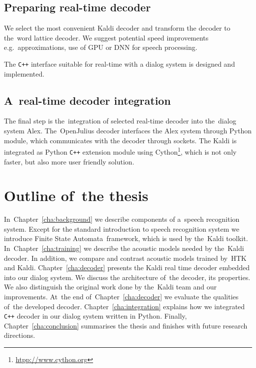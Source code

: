 \subsection{Preparing real-time decoder} 
\label{sub:compare_rt}

We select the most convenient Kaldi decoder and 
transform the decoder to the~word lattice decoder. 
We suggest potential speed improvements e.g.\ approximations, use of \ac{GPU} 
or \ac{DNN} for speech processing\cite{vesely2013sequencediscriminative}.

The \verb!C++! interface suitable for real-time with a dialog system is designed and implemented.

\subsection{A~real-time decoder integration} 
\label{sub:integration}
The final step is the~integration of selected real-time decoder into the~dialog system Alex.
The~OpenJulius decoder interfaces the Alex system through Python module, 
which communicates with the decoder through sockets.
The Kaldi is integrated as Python \verb!C++! extension module 
using Cython\footnote{\url{htpp://www.cython.org}}, 
which is not only faster, but also more user friendly solution.


\section{Outline of~the thesis} 
\label{sec:outline_of_the_thesis}
In~Chapter~\ref{cha:background} we describe components of a~speech recognition system.  
Except for the standard introduction to speech recognition system we introduce Finite State Automata~framework,
which is used by the~Kaldi toolkit. In~Chapter~\ref{cha:training} we describe the acoustic 
models needed by the~Kaldi decoder. 
In addition, we compare and contrast acoustic models trained by~\ac{HTK} and Kaldi. 
Chapter~\ref{cha:decoder} presents the Kaldi real time decoder embedded into our dialog system.
We discuss the architecture of~the decoder, its properties. 
We also distinguish the original work done by the~Kaldi team and our improvements. 
At~the end of~Chapter~\ref{cha:decoder} 
we evaluate the qualities of~the developed decoder.
Chapter~\ref{cha:integration} explains how we integrated \verb!C++! decoder in our dialog system written in Python.
Finally, Chapter~\ref{cha:conclusion} summarises the thesis and finishes with future research directions.

